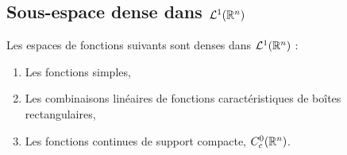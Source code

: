 \subsection{Sous-espace dense dans $\mathcal L^{1}(\mathbb{R}^n)$}

\begin{proposition}
	Les espaces de fonctions suivants sont denses dans $\mathcal L^{1}(\mathbb{R}^n)$ : 
	\begin{enumerate}
		\item Les fonctions simples,
		\item Les combinaisons linéaires de fonctions caractéristiques de boîtes rectangulaires,
		\item Les fonctions continues de support compacte, $C_c^0(\mathbb{R}^n)$.
	\end{enumerate}
\end{proposition}

